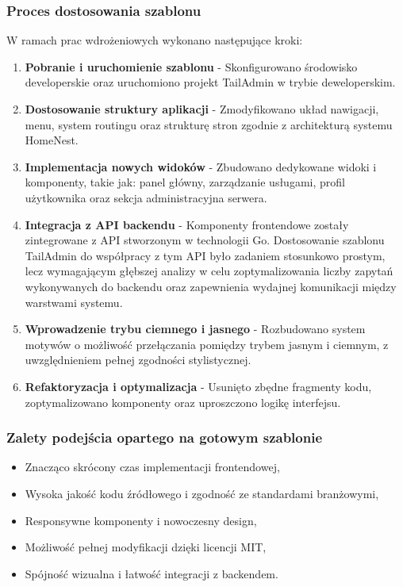 \subsubsection{Proces dostosowania szablonu}
W ramach prac wdrożeniowych wykonano następujące kroki:
\begin{enumerate}
    \item \textbf{Pobranie i uruchomienie szablonu} - Skonfigurowano środowisko developerskie oraz uruchomiono projekt TailAdmin w trybie deweloperskim.
    \item \textbf{Dostosowanie struktury aplikacji} - Zmodyfikowano układ nawigacji, menu, system routingu oraz strukturę stron zgodnie z architekturą systemu HomeNest.
    \item \textbf{Implementacja nowych widoków} - Zbudowano dedykowane widoki i komponenty, takie jak: panel główny, zarządzanie usługami, profil użytkownika oraz sekcja administracyjna serwera.
    \item \textbf{Integracja z API backendu} - Komponenty frontendowe zostały zintegrowane z API stworzonym w technologii Go. Dostosowanie szablonu TailAdmin do współpracy z tym API było zadaniem stosunkowo prostym, lecz wymagającym głębszej analizy w celu zoptymalizowania liczby zapytań wykonywanych do backendu oraz zapewnienia wydajnej komunikacji między warstwami systemu.
    \item \textbf{Wprowadzenie trybu ciemnego i jasnego} - Rozbudowano system motywów o możliwość przełączania pomiędzy trybem jasnym i ciemnym, z uwzględnieniem pełnej zgodności stylistycznej.
    \item \textbf{Refaktoryzacja i optymalizacja} - Usunięto zbędne fragmenty kodu, zoptymalizowano komponenty oraz uproszczono logikę interfejsu.
\end{enumerate}

\subsubsection{Zalety podejścia opartego na gotowym szablonie}
\begin{itemize}
    \item Znacząco skrócony czas implementacji frontendowej,
    \item Wysoka jakość kodu źródłowego i zgodność ze standardami branżowymi,
    \item Responsywne komponenty i nowoczesny design,
    \item Możliwość pełnej modyfikacji dzięki licencji MIT,
    \item Spójność wizualna i łatwość integracji z backendem.
\end{itemize}

